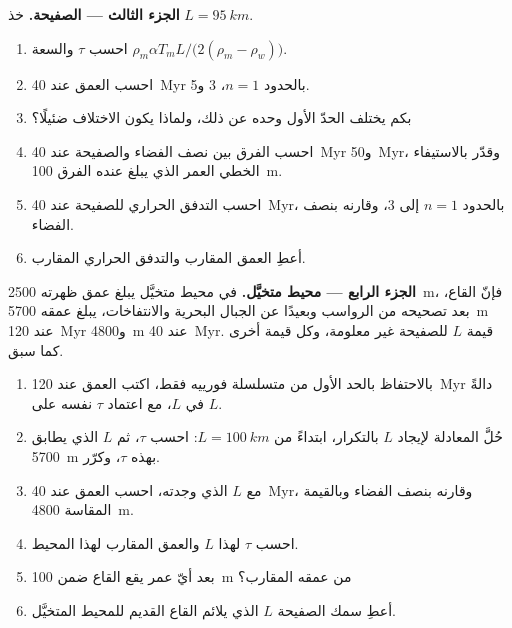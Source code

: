 \begin{problem}
\medskip\noindent\textbf{الجزء الثالث --- الصفيحة.} خذ $L = \qty{95}{km}$.
\begin{enumerate}[resume]
  \item احسب $\tau$ والسعة $\rho_m\alpha T_mL/\bigl(2(\rho_m -
        \rho_w)\bigr)$.
  \item احسب العمق عند \qty{40}{Myr} بالحدود $n = 1$، 3 و5.
  \item بكم يختلف الحدّ الأول وحده عن ذلك، ولماذا
        يكون الاختلاف ضئيلًا؟
  \item احسب الفرق بين نصف الفضاء والصفيحة عند \qty{40}{Myr}
        و\qty{50}{Myr}، وقدّر بالاستيفاء الخطي العمر الذي يبلغ عنده
        الفرق \qty{100}{m}.
  \item احسب التدفق الحراري للصفيحة عند \qty{40}{Myr}، بالحدود
        $n = 1$ إلى 3، وقارنه بنصف الفضاء.
  \item أعطِ العمق المقارب والتدفق الحراري المقارب.
\end{enumerate}

\medskip\noindent\textbf{الجزء الرابع --- محيط متخيَّل.} في محيط متخيَّل
يبلغ عمق ظهرته \qty{2500}{m}، فإنّ القاع، بعد تصحيحه من الرواسب وبعيدًا عن الجبال البحرية والانتفاخات،
يبلغ عمقه \qty{5700}{m} عند \qty{120}{Myr} و\qty{4800}{m} عند \qty{40}{Myr}.
قيمة $L$ للصفيحة غير معلومة، وكل قيمة أخرى
كما سبق.
\begin{enumerate}[resume]
  \item بالاحتفاظ بالحد الأول من متسلسلة فورييه فقط، اكتب العمق عند
        \qty{120}{Myr} دالةً في $L$، مع اعتماد $\tau$ نفسه على
        $L$.
  \item حُلَّ المعادلة لإيجاد $L$ بالتكرار، ابتداءً من $L = \qty{100}{km}$:
        احسب $\tau$، ثم $L$ الذي يطابق \qty{5700}{m} بهذه
        $\tau$، وكرّر.
  \item مع $L$ الذي وجدته، احسب العمق عند \qty{40}{Myr}، وقارنه
        بنصف الفضاء وبالقيمة المقاسة \qty{4800}{m}.
  \item احسب $\tau$ لهذا $L$ والعمق المقارب لهذا المحيط.
  \item بعد أيّ عمر يقع القاع ضمن \qty{100}{m} من
        عمقه المقارب؟
  \item أعطِ سمك الصفيحة $L$ الذي يلائم القاع القديم للمحيط
        المتخيَّل.
\end{enumerate}
\end{problem}
